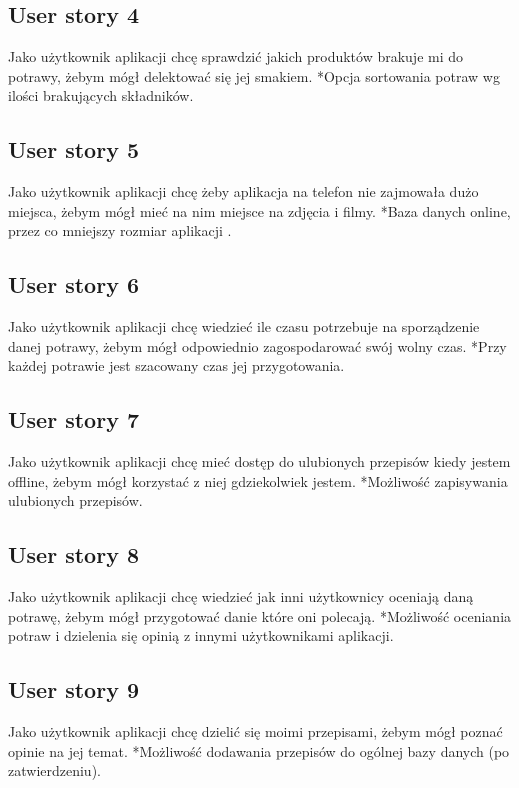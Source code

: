 \documentclass[a4paper]{article}
\begin{document}
\subsection{User story 4}
Jako użytkownik aplikacji chcę sprawdzić jakich produktów brakuje mi do potrawy, żebym mógł delektować się jej smakiem. \newline
*Opcja sortowania potraw wg ilości brakujących składników.

\subsection{User story 5}
Jako użytkownik aplikacji chcę żeby aplikacja na telefon nie zajmowała dużo miejsca, żebym mógł mieć na nim miejsce na zdjęcia i filmy. \newline
*Baza danych online, przez co mniejszy rozmiar aplikacji .

\subsection{User story 6}
Jako użytkownik aplikacji chcę wiedzieć ile czasu potrzebuje na sporządzenie danej potrawy, żebym mógł odpowiednio zagospodarować swój wolny czas. \newline
*Przy każdej potrawie jest szacowany czas jej przygotowania.

\subsection{User story 7}
Jako użytkownik aplikacji chcę mieć dostęp do ulubionych przepisów kiedy jestem offline, żebym mógł korzystać z niej gdziekolwiek jestem. \newline
*Możliwość zapisywania ulubionych przepisów.

\subsection{User story 8}
Jako użytkownik aplikacji chcę wiedzieć jak inni użytkownicy oceniają daną potrawę, żebym mógł przygotować danie które oni polecają. \newline
*Możliwość oceniania potraw i dzielenia się opinią z innymi użytkownikami aplikacji.

\subsection{User story 9}
Jako użytkownik aplikacji chcę dzielić się moimi przepisami, żebym mógł poznać opinie na jej temat. \newline
*Możliwość dodawania przepisów do ogólnej bazy danych (po zatwierdzeniu).
\end{document}
